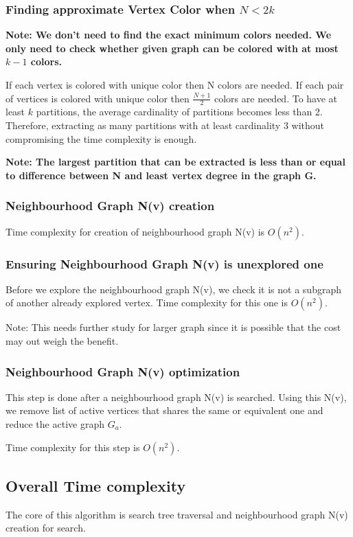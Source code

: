 \documentclass[12pt]{article}
\theoremstyle{plain}
\theoremstyle{definition}
\begin{document}
\subsubsection{Finding approximate Vertex Color when $N < 2k$}
\textbf{Note: We don't need to find the exact minimum colors needed. We only need to check whether given graph can be colored with at most $k-1$ colors.}

If each vertex is colored with unique color then N colors are needed. If each pair of vertices is colored with unique color then $\frac{N+1}{2}$ colors are needed. To have at least $k$ partitions, the average cardinality of partitions becomes less than 2. Therefore, extracting as many partitions with at least cardinality 3 without compromising the time complexity is enough.

\textbf{Note: The largest partition that can be extracted is less than or equal to difference between N and least vertex degree in the graph G.
}



\subsubsection{Neighbourhood Graph N(v) creation}
Time complexity for creation of neighbourhood graph N(v) is $O(n^2)$.

\subsubsection{Ensuring Neighbourhood Graph N(v) is unexplored one}
Before we explore the neighbourhood graph N(v), we check it is not a subgraph of another already explored vertex. Time complexity for this one is $O(n^2)$.

Note: This needs further study for larger graph since it is possible that the cost may out weigh the benefit.

\subsubsection{Neighbourhood Graph N(v) optimization}
This step is done after a neighbourhood graph N(v) is searched. Using this N(v), we remove list of active vertices that shares the same or equivalent one and reduce the active graph $G_a$. 

Time complexity for this step is $O(n^2)$.

\subsection{Overall Time complexity}
The core of this algorithm is search tree traversal and neighbourhood graph N(v) creation for search.
\end{document}
